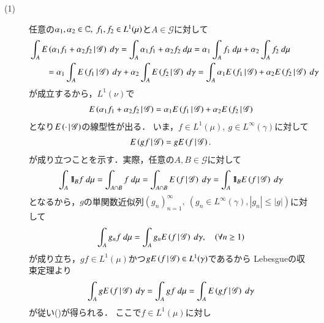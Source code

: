 	\begin{prf}\mbox{}
		\begin{description}
			\item[(1)]
				任意の$\alpha_1,\alpha_2 \in \mathbb{C},\ f_1,f_2 \in L^1(\mu)$と$A \in \mathscr{G}$に対して
				\begin{align}
					&\int_A \cexp{\alpha_1 f_1 + \alpha_2 f_2}{\mathscr{G}}\ d\gamma
					= \int_A \alpha_1 f_1 + \alpha_2 f_2\ d\mu
					= \alpha_1 \int_A f_1\ d\mu + \alpha_2 \int_A f_2\ d\mu \\
					&\qquad = \alpha_1 \int_A \cexp{f_1}{\mathscr{G}}\ d\gamma 
						+ \alpha_2 \int_A \cexp{f_2}{\mathscr{G}}\ d\gamma
					= \int_A \alpha_1 \cexp{f_1}{\mathscr{G}} + \alpha_2 \cexp{f_2}{\mathscr{G}}\ d\gamma
				\end{align}
				が成立するから，$L^1(\nu)$で
				\begin{align}
					E\left( \alpha_1 f_1 + \alpha_2 f_2 \, \middle|\, \mathscr{G} \right)
					= \alpha_1 E\left( f_1 \, \middle|\, \mathscr{G} \right) + \alpha_2 E\left( f_2 \, \middle|\, \mathscr{G} \right)
				\end{align}
				となり$E\left( \cdot \, \middle|\, \mathscr{G} \right)$の線型性が出る．
				いま，$f \in L^1(\mu),\ g \in L^\infty(\gamma)$に対して
				\begin{align}
					E\left( gf \, \middle|\, \mathscr{G} \right) = gE\left( f \, \middle|\, \mathscr{G} \right).
					\label{eq:thm_properties_of_conditional_expectations_1}
				\end{align}
				が成り立つことを示す．実際，任意の$A,B \in \mathscr{G}$に対して
				\begin{align}
					\int_A \mbox{1}\hspace{-0.25em}\mbox{l}_B f\ d\mu
					= \int_{A \cap B} f\ d\mu
					= \int_{A \cap B} E\left( f \, \middle|\, \mathscr{G} \right)\ d\gamma
					= \int_A \mbox{1}\hspace{-0.25em}\mbox{l}_B E\left( f \, \middle|\, \mathscr{G} \right)\ d\gamma
				\end{align}
				となるから，$g$の単関数近似列$(g_n)_{n=1}^\infty,\ \left(g_n \in L^\infty(\gamma),|g_n| \leq |g|\right)$に対して
				\begin{align}
					\int_A g_n f\ d\mu = \int_A g_n E\left( f \, \middle|\, \mathscr{G} \right)\ d\gamma,
					\quad (\forall n \geq 1)
				\end{align}
				が成り立ち，$gf \in L^1(\mu)$かつ$gE\left( f \, \middle|\, \mathscr{G} \right) \in L^1(\gamma)$であるから
				Lebesgueの収束定理より
				\begin{align}
					\int_A g E\left( f \, \middle|\, \mathscr{G} \right)\ d\gamma
					= \int_A g f\ d\mu
					= \int_A E\left( g f \, \middle|\, \mathscr{G} \right)\ d\gamma
				\end{align}
				が従い()が得られる．
				ここで$f \in L^1(\mu)$に対し
				\begin{align}

\end{align}
\end{description}
\end{prf}
